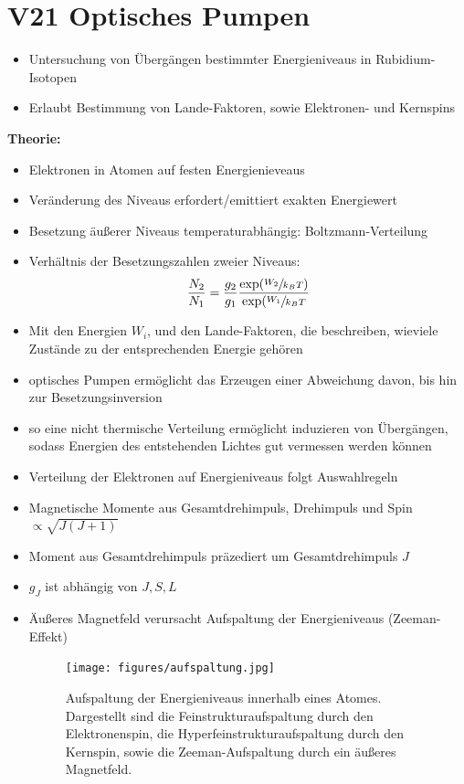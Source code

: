 \section{V21 Optisches Pumpen}
\label{sec:V21}

\begin{itemize}
    \item Untersuchung von Übergängen bestimmter Energieniveaus in Rubidium-Isotopen
    \item Erlaubt Bestimmung von Lande-Faktoren, sowie Elektronen- und Kernspins
\end{itemize}

\textbf{Theorie:}
\begin{itemize}
    \item Elektronen in Atomen auf festen Energienieveaus
    \item Veränderung des Niveaus erfordert/emittiert exakten Energiewert
    \item Besetzung äußerer Niveaus temperaturabhängig: Boltzmann-Verteilung
    \item Verhältnis der Besetzungszahlen zweier Niveaus:
        \begin{equation}
            \frac{N_2}{N_1}=\frac{g_2}{g_1}\frac{\exp(\sfrac{W_2}{k_BT})}{\exp(\sfrac{W_1}{k_BT}}
        \end{equation}
    \item Mit den Energien $W_i$, und den Lande-Faktoren, die beschreiben, wieviele Zustände zu der entsprechenden Energie gehören
    \item optisches Pumpen ermöglicht das Erzeugen einer Abweichung davon, bis hin zur Besetzungsinversion
    \item so eine nicht thermische Verteilung ermöglicht induzieren von Übergängen, sodass Energien des entstehenden Lichtes gut vermessen werden können
    \item Verteilung der Elektronen auf Energieniveaus folgt Auswahlregeln
    \item Magnetische Momente aus Gesamtdrehimpuls, Drehimpuls und Spin $\propto \sqrt{J(J+1)}$
    \item Moment aus Gesamtdrehimpuls präzediert um Gesamtdrehimpuls $J$
    \item $g_J$ ist abhängig von $J,S,L$
    \item Äußeres Magnetfeld verursacht Aufspaltung der Energieniveaus (Zeeman-Effekt)
       \begin{figure}[htb]
          \centering
          \texttt{[image: figures/aufspaltung.jpg]}
          \caption{Aufspaltung der Energieniveaus innerhalb eines Atomes. Dargestellt
                    sind die Feinstrukturaufspaltung durch den Elektronenspin, die
                    Hyperfeinstrukturaufspaltung durch den Kernspin, sowie die Zeeman-Aufspaltung
                    durch ein äußeres Magnetfeld.}
        \end{figure}
\end{itemize}

